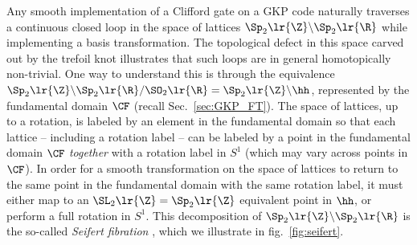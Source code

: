 \documentclass[a4paper, aps, pra, 11pt, onecolumn, tightenlines, superscriptaddress]{revtex4-2}
\begin{document}
Any smooth implementation of a Clifford gate on a GKP code naturally traverses a continuous closed loop in the space of lattices $\Sp_2\lr{\Z}\backslash \Sp_2\lr{\R}$ while implementing a basis transformation. 
The topological defect in this space carved out by the trefoil knot illustrates that such loops are in general homotopically non-trivial.
One way to understand this is through the equivalence $\Sp_2\lr{\Z}\backslash \Sp_2\lr{\R}/\SO_2\lr{\R}=\Sp_2\lr{\Z}\backslash \hh$, represented by the fundamental domain $\CF$ (recall Sec.~\ref{sec:GKP_FT}). 
The space of lattices, up to a rotation, is labeled by an element in the fundamental domain so that each lattice -- including a rotation label --  can be labeled by a point in the fundamental domain $\CF$ \textit{together} with a rotation label in $S^1$ (which may vary across points in $\CF$). 
In order for a smooth transformation on the space of lattices to return to the same point in the fundamental domain with the same rotation label, it must either map to an $\SL_2\lr{\Z}=\Sp_2\lr{\Z}$ equivalent point in $\hh$, or perform a full rotation in $S^1$. 
This decomposition of $\Sp_2\lr{\Z}\backslash \Sp_2\lr{\R}$ is the so-called \textit{Seifert fibration} \cite{Seifert}, which we illustrate in fig.~\ref{fig:seifert}. 
\end{document}

